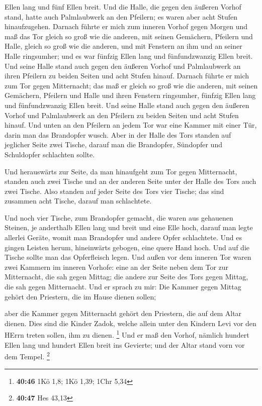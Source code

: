 Ellen lang und fünf Ellen breit.  Und die Halle, die
gegen den äußeren Vorhof stand, hatte auch Palmlaubwerk an den Pfeilern;
es waren aber acht Stufen hinaufzugehen.  Darnach führte
er mich zum inneren Vorhof gegen Morgen und maß das Tor gleich so groß
wie die anderen,  mit seinen Gemächern, Pfeilern und
Halle, gleich so groß wie die anderen, und mit Fenstern an ihm und an
seiner Halle ringsumher; und es war fünfzig Ellen lang und
fünfundzwanzig Ellen breit.  Und seine Halle stand auch
gegen den äußeren Vorhof und Palmlaubwerk an ihren Pfeilern zu beiden
Seiten und acht Stufen hinauf.  Darnach führte er mich
zum Tor gegen Mitternacht; das maß er gleich so groß wie die anderen,
 mit seinen Gemächern, Pfeilern und Halle und ihren
Fenstern ringsumher, fünfzig Ellen lang und fünfundzwanzig Ellen breit.
 Und seine Halle stand auch gegen den äußeren Vorhof und
Palmlaubwerk an den Pfeilern zu beiden Seiten und acht Stufen hinauf.
 Und unten an den Pfeilern an jedem Tor war eine Kammer
mit einer Tür, darin man das Brandopfer wusch.  Aber in
der Halle des Tors standen auf jeglicher Seite zwei Tische, darauf man
die Brandopfer, Sündopfer und Schuldopfer schlachten sollte.

 Und herauswärts zur Seite, da man hinaufgeht zum Tor
gegen Mitternacht, standen auch zwei Tische und an der anderen Seite
unter der Halle des Tors auch zwei Tische.  Also standen
auf jeder Seite des Tors vier Tische; das sind zusammen acht Tische,
darauf man schlachtete.

 Und noch vier Tische, zum Brandopfer gemacht, die waren
aus gehauenen Steinen, je anderthalb Ellen lang und breit und eine Elle
hoch, darauf man legte allerlei Geräte, womit man Brandopfer und andere
Opfer schlachtete.  Und es gingen Leisten herum,
hineinwärts gebogen, eine quere Hand hoch. Und auf die Tische sollte man
das Opferfleisch legen.  Und außen vor dem inneren Tor
waren zwei Kammern im inneren Vorhofe: eine an der Seite neben dem Tor
zur Mitternacht, die sah gegen Mittag; die andere zur Seite des Tors
gegen Mittag, die sah gegen Mitternacht.  Und er sprach
zu mir: Die Kammer gegen Mittag gehört den Priestern, die im Hause
dienen sollen;

 aber die Kammer gegen Mitternacht gehört den Priestern,
die auf dem Altar dienen. Dies sind die Kinder Zadok, welche allein
unter den Kindern Levi vor den HErrn treten sollen, ihm zu dienen.
\footnote{\textbf{40:46} 1Kö 1,8; 1Kö 1,39; 1Chr 5,34} 
Und er maß den Vorhof, nämlich hundert Ellen lang und hundert Ellen
breit ins Gevierte; und der Altar stand vorn vor dem Tempel. \footnote{\textbf{40:47}
  Hes 43,13}

